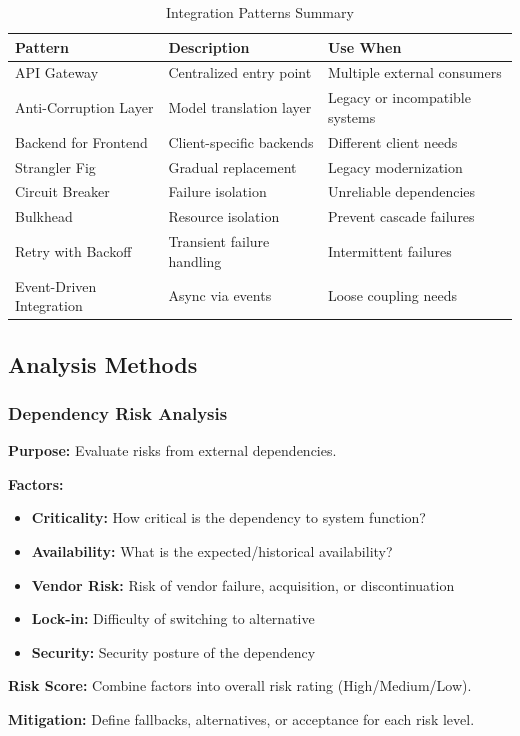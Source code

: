 \documentclass[11pt,letterpaper]{article}
\begin{document}
\begin{table}[H]
\centering
\caption{Integration Patterns Summary}
\small
\begin{tabular}{@{}L{2.8cm}L{4.2cm}L{5.5cm}@{}}
\toprule
\textbf{Pattern} & \textbf{Description} & \textbf{Use When} \\
\midrule
API Gateway & Centralized entry point & Multiple external consumers \\
\addlinespace
Anti-Corruption Layer & Model translation layer & Legacy or incompatible systems \\
\addlinespace
Backend for Frontend & Client-specific backends & Different client needs \\
\addlinespace
Strangler Fig & Gradual replacement & Legacy modernization \\
\addlinespace
Circuit Breaker & Failure isolation & Unreliable dependencies \\
\addlinespace
Bulkhead & Resource isolation & Prevent cascade failures \\
\addlinespace
Retry with Backoff & Transient failure handling & Intermittent failures \\
\addlinespace
Event-Driven Integration & Async via events & Loose coupling needs \\
\bottomrule
\end{tabular}
\end{table}

\subsection{Analysis Methods}

\subsubsection{Dependency Risk Analysis}

\begin{definitionbox}
\textbf{Purpose:} Evaluate risks from external dependencies.

\textbf{Factors:}
\begin{itemize}[nosep]
    \item \textbf{Criticality:} How critical is the dependency to system function?
    \item \textbf{Availability:} What is the expected/historical availability?
    \item \textbf{Vendor Risk:} Risk of vendor failure, acquisition, or discontinuation
    \item \textbf{Lock-in:} Difficulty of switching to alternative
    \item \textbf{Security:} Security posture of the dependency
\end{itemize}

\textbf{Risk Score:} Combine factors into overall risk rating (High/Medium/Low).

\textbf{Mitigation:} Define fallbacks, alternatives, or acceptance for each risk level.
\end{definitionbox}
\end{document}
